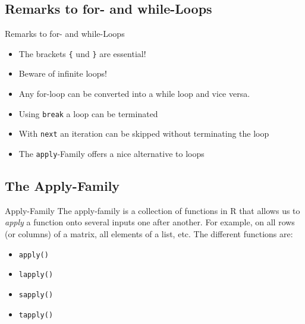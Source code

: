 \documentclass[aspectratio = 169]{chariteBeamer}
\begin{document}
\subsection*{Remarks to for- and while-Loops}

\begin{frame}[fragile]{Remarks to for- and while-Loops}
  \begin{itemize}
    \item The brackets \verb+{+ und \verb+}+ are essential!
    \item Beware of infinite loops!
    \item Any for-loop can be converted into a while loop and vice versa.
    \item Using \verb+break+ a loop can be terminated
    \item With \verb+next+ an iteration can be skipped without terminating the loop
    \item The \verb+apply+-Family offers a nice alternative to loops
    \end{itemize}
\end{frame}

\subsection*{The Apply-Family}

\begin{frame}[fragile]{Apply-Family}
	The apply-family is a collection of functions in R that allows us to \textit{apply} a function onto several inputs one after another. For example, on all rows (or columns) of a matrix, all elements of a list, etc. The different functions are:
	\begin{itemize}
		\item \verb+apply()+
		\item \verb+lapply()+
		\item \verb+sapply()+
		\item \verb+tapply()+
	\end{itemize}
\end{frame}
\end{document}
